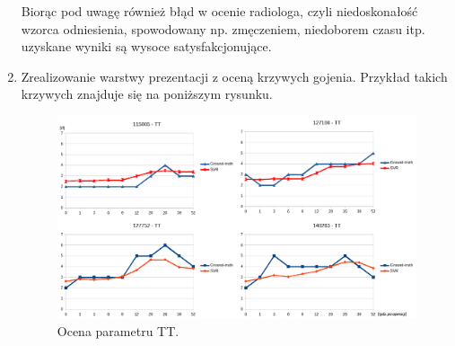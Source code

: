 \begin{enumerate}
	Biorąc pod uwagę również błąd w ocenie radiologa, czyli niedoskonałość wzorca odniesienia, spowodowany np. zmęczeniem, niedoborem czasu itp. uzyskane wyniki są wysoce satysfakcjonujące.
	\item Zrealizowanie warstwy prezentacji z oceną krzywych gojenia. Przykład takich krzywych znajduje się na poniższym rysunku.
	 \begin{figure}[h!]
	 	\centering
	 	\includegraphics[width=1\textwidth]{figures/TT.png}
	 	\caption{Ocena parametru TT.}\label{fig:TT}
	 \end{figure}
 

\end{enumerate}
